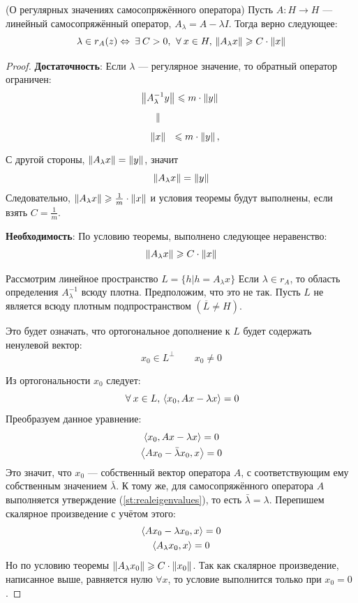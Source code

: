 \documentclass[12pt]{article}
\begin{document}
		\begin{theorem}
			(О регулярных значениях самосопряжённого оператора) Пусть $A: H \rightarrow H$ --- линейный 
			самосопряжённый оператор, $A_{\lambda} = A - \lambda I$. Тогда верно следующее:
			$$\lambda \in r_{A}(z) \Leftrightarrow \exists C > 0,\, \forall x \in H,\, \norm{A_{\lambda}x} \geq C\cdot\norm{x}$$
		\end{theorem}
		\begin{proof}
			\textbf{Достаточность}: 
			Если $\lambda$ --- регулярное значение, то обратный оператор ограничен:
			$$
			\begin{CD}
				\norm{A_{\lambda}^{-1}y} @.\leq m\cdot\norm{y} \\
				\parallel \\		
				\norm{x} @.\leq m\cdot\norm{y},\,
			\end{CD}
			$$
		
			С другой стороны, $\left\| A_{\lambda}x \right\| = \left\| y \right\|$, значит
			$$\left\| A_{\lambda}x \right\| = \left\| y \right\|$$
			Следовательно, $\left\| A_{\lambda}x \right\|\geqslant\frac{1}{m}\cdot\left\| x \right\|$ и условия теоремы будут выполнены, если взять
			$C = \frac{1}{m}$.
		
			\textbf{Необходимость}: 
			По условию теоремы, выполнено следующее неравенство:
			$$\left\| A_{\lambda}x \right\| \geqslant C\cdot\left\| x \right\|$$
		
			Рассмотрим линейное пространство $L = \{ h|h=A_{\lambda}x\}$ Если $\lambda \in r_A$, то область определения
			$A_{\lambda}^{-1}$ всюду плотна. Предположим, что это не так. Пусть $L$ не 
			является всюду плотным подпространством $\left(\overline{L}\neq H\right)$.
		
			Это будет означать, что ортогональное дополнение к $L$ будет содержать ненулевой вектор:
			$$x_0 \in L^{\perp} \qquad x_0 \neq 0$$
		
			Из ортогональности $x_0$ следует:
			$$\forall x\in L,\, \scal{x_0}{Ax - \lambda x} = 0$$
			Преобразуем данное уравнение:
			\begin{gather*}
				\left\langle x_0, Ax - \lambda x \right\rangle = 0 \\
				\left\langle Ax_0 - \bar{\lambda} x_0, x \right\rangle = 0 \\
			\end{gather*}
			Это значит, что $x_0$ --- собственный вектор оператора $A$, с соответствующим ему собственным значением $\bar{\lambda}$.
			К тому же, для самосопряжённого оператора $A$ выполняется утверждение (\ref{st:realeigenvalues}), то есть 
			$\bar{\lambda} = \lambda$. Перепишем скалярное произведение с учётом этого:
			\begin{gather*}
				\left\langle Ax_0 - \lambda x_0, x \right\rangle = 0 \\
				\left\langle A_{\lambda} x_0, x \right\rangle = 0
			\end{gather*}
			Но по условию теоремы $\left\| A_{\lambda}x_0 \right\| \geqslant C\cdot\left\| x_0 \right\|$. Так как скалярное произведение, 
			написанное выше, равняется нулю $\forall x$, то условие выполнится только при $x_0 = 0$. 
		

\end{proof}
\end{document}
